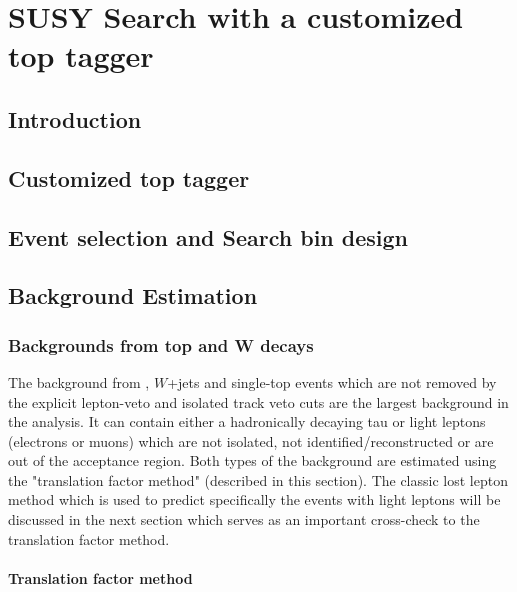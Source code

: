 \chapter{SUSY Search with a customized top tagger}

\clearpage
\section{Introduction}
\label{sec:c4intro}


\clearpage
\section{Customized top tagger}
\label{sec:c4tt}


\clearpage
\section{Event selection and Search bin design}
\label{sec:c4evssbd}


\clearpage
\section{Background Estimation}

\clearpage
\subsection{Backgrounds from top and W decays}
The background from \ttbar, $W$+jets and single-top events which are not removed by the explicit lepton-veto and isolated track veto cuts are the largest background in the analysis. It can contain either a hadronically decaying tau or light leptons (electrons or muons) which are not isolated, not identified/reconstructed or are out of the acceptance region. Both types of the background are estimated using the "translation factor method" (described in this section). The classic lost lepton method which is used to predict specifically the events with light leptons will be discussed in the next section which serves as an important cross-check to the translation factor method.

\clearpage
\subsubsection{Translation factor method}
\label{sec:c4bgtf}


